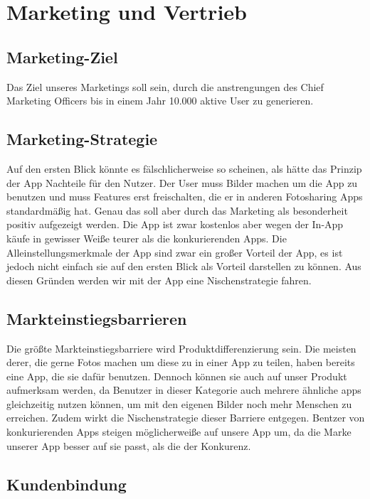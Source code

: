 \chapter{Marketing und Vertrieb}


\section{Marketing-Ziel}

Das Ziel unseres Marketings soll sein, durch die anstrengungen des Chief Marketing Officers bis in einem Jahr 10.000 aktive User zu generieren.

\section{Marketing-Strategie}

Auf den ersten Blick könnte es fälschlicherweise so scheinen, als hätte das Prinzip der App Nachteile für den Nutzer. Der User muss Bilder machen um die App zu benutzen und muss Features erst freischalten, die er in anderen Fotosharing Apps standardmäßig hat. Genau das soll aber durch das Marketing als besonderheit positiv aufgezeigt werden.
Die App ist zwar kostenlos aber wegen der In-App käufe in gewisser Weiße teurer als die konkurierenden Apps. Die Alleinstellungsmerkmale der App sind zwar ein großer Vorteil der App, es ist jedoch nicht einfach sie auf den ersten Blick als Vorteil darstellen zu können. Aus diesen Gründen werden wir mit der App eine Nischenstrategie fahren.

\section{Markteinstiegsbarrieren}

Die größte Markteinstiegsbarriere wird Produktdifferenzierung sein. Die meisten derer, die gerne Fotos machen um diese zu in einer App zu teilen, haben bereits eine App, die sie dafür benutzen. Dennoch können sie auch auf unser Produkt aufmerksam werden, da Benutzer in dieser Kategorie auch mehrere ähnliche apps gleichzeitig nutzen können, um mit den eigenen Bilder noch mehr Menschen zu erreichen.
Zudem wirkt die Nischenstrategie dieser Barriere entgegen. Bentzer von konkurierenden Apps steigen möglicherweiße auf unsere App um, da die Marke unserer App besser auf sie passt, als die der Konkurenz.

\section{Kundenbindung}


